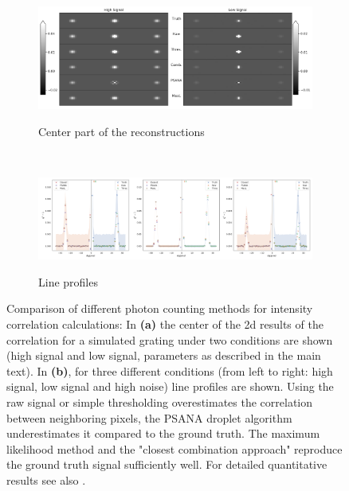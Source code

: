\begin{figure}
	\centering
	\begin{subfigure}[b]{0.85\textwidth}
		\includegraphics[width=\linewidth]{images/photonreconimg.pdf}
		\label{fig:photonreconimg}
		\caption{Center part of the reconstructions}
	\end{subfigure}
\\
	\begin{subfigure}[b]{0.95\textwidth}
		\includegraphics[width=\linewidth]{images/photonrecon.pdf}
		\label{fig:photonrecon}
		\caption{Line profiles}
	\end{subfigure}	
	
	\caption[Comparison of different photon counting methods for intensity correlation calculations]{Comparison of different photon counting methods for intensity correlation calculations: In \textbf{(a)} the center of the 2d results of the correlation for a simulated grating under two conditions are shown (high signal and low signal, parameters as described in the main text). In  \textbf{(b)}, for three different conditions (from left to right: high signal, low signal and high noise) line profiles are shown. Using the raw signal or simple thresholding overestimates the correlation between neighboring pixels, the PSANA droplet algorithm underestimates it compared to the ground truth. The maximum likelihood method and the "closest combination approach" reproduce the ground truth signal sufficiently well. For detailed quantitative results see also .}
\end{figure}

